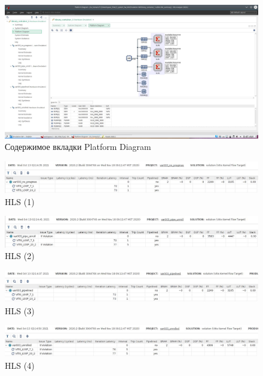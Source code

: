\begin{figure}[ht]
	\centering
	\includegraphics[width=0.9\linewidth]{img/hw-5}
	\caption{Содержимое вкладки Platform Diagram}
	\label{fig:hw-5}
\end{figure}

\begin{figure}[ht]
	\centering
	\includegraphics[width=0.9\linewidth]{img/hw-hls-1}
	\caption{HLS (1)}
	\label{fig:hw-hls-1}
\end{figure}

\begin{figure}[ht]
	\centering
	\includegraphics[width=0.9\linewidth]{img/hw-hls-2}
	\caption{HLS (2)}
	\label{fig:hw-hls-2}
\end{figure}

\begin{figure}[ht]
	\centering
	\includegraphics[width=0.9\linewidth]{img/hw-hls-3}
	\caption{HLS (3)}
	\label{fig:hw-hls-3}
\end{figure}

\begin{figure}[ht]
	\centering
	\includegraphics[width=0.9	\linewidth]{img/hw-hls-4}
	\caption{HLS (4)}
	\label{fig:hw-hls-4}
\end{figure}

